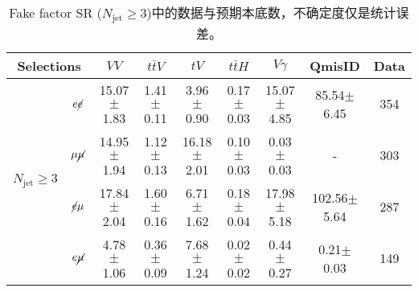 \begin{table}[!ht]
\begin{center}
\scriptsize
\begin{tabular}{c|c|cccc|c|c|c}
\hline
\hline
\multicolumn{2}{c|}{ Selections}                      &$VV$  &$t\bar{t}V$    &$tV$    &$t\bar{t}H$     &$V\gamma$  &QmisID  &Data \\
\hline\multirow{4}{*}{$ N_{\text{jet}} \geq 3$}  &$e\cancel{e}$ &15.07$\pm$1.83    &1.41$\pm$0.11    &3.96$\pm$0.90    &0.17$\pm$0.03    &15.07$\pm$4.85    &85.54$\pm$6.45    &354 \\
\cline{2-9}                                                &$\mu\cancel{\mu}$ &14.95$\pm$1.94    &1.12$\pm$0.13    &16.18$\pm$2.01    &0.10$\pm$0.03    &0.03$\pm$0.03    &-    &303 \\
\cline{2-9}                                                &$\cancel{e}\mu$ &17.84$\pm$2.04    &1.60$\pm$0.16    &6.71$\pm$1.62    &0.18$\pm$0.04    &17.98$\pm$5.18    &102.56$\pm$5.64    &287\\
\cline{2-9}                                                &$e\cancel{\mu}$ &4.78$\pm$1.06    &0.36$\pm$0.09    &7.68$\pm$1.24    &0.02$\pm$0.02    &0.44$\pm$0.27    &0.21$\pm$0.03    &149\\
\hline
\hline
\end{tabular}
\caption{Fake factor SR ($N_{\text{jet}} \geq 3$)中的数据与预期本底数，不确定度仅是统计误差。}
\label{tab:high_Njet_CR_eventyield}
\end{center}
\end{table}
